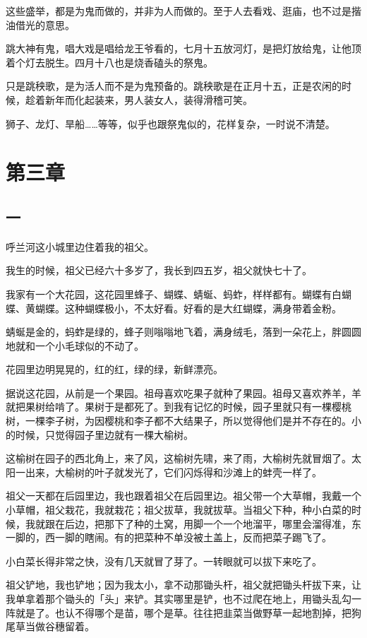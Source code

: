 \documentclass[UTF8]{ctexart}
\begin{document}
这些盛举，都是为鬼而做的，并非为人而做的。至于人去看戏、逛庙，也不过是揩油借光的意思。

跳大神有鬼，唱大戏是唱给龙王爷看的，七月十五放河灯，是把灯放给鬼，让他顶着个灯去脱生。四月十八也是烧香磕头的祭鬼。

只是跳秧歌，是为活人而不是为鬼预备的。跳秧歌是在正月十五，正是农闲的时候，趁着新年而化起装来，男人装女人，装得滑稽可笑。

狮子、龙灯、旱船……等等，似乎也跟祭鬼似的，花样复杂，一时说不清楚。

\section{第三章}

\subsection{一}

呼兰河这小城里边住着我的祖父。

我生的时候，祖父已经六十多岁了，我长到四五岁，祖父就快七十了。

我家有一个大花园，这花园里蜂子、蝴蝶、蜻蜒、蚂蚱，样样都有。蝴蝶有白蝴蝶、黄蝴蝶。这种蝴蝶极小，不太好看。好看的是大红蝴蝶，满身带着金粉。

蜻蜒是金的，蚂蚱是绿的，蜂子则嗡嗡地飞着，满身绒毛，落到一朵花上，胖圆圆地就和一个小毛球似的不动了。

花园里边明晃晃的，红的红，绿的绿，新鲜漂亮。

据说这花园，从前是一个果园。祖母喜欢吃果子就种了果园。祖母又喜欢养羊，羊就把果树给啃了。果树于是都死了。到我有记忆的时候，园子里就只有一棵樱桃树，一棵李子树，为因樱桃和李子都不大结果子，所以觉得他们是并不存在的。小的时候，只觉得园子里边就有一棵大榆树。

这榆树在园子的西北角上，来了风，这榆树先啸，来了雨，大榆树先就冒烟了。太阳一出来，大榆树的叶子就发光了，它们闪烁得和沙滩上的蚌壳一样了。

祖父一天都在后园里边，我也跟着祖父在后园里边。祖父带一个大草帽，我戴一个小草帽，祖父栽花，我就栽花；祖父拔草，我就拔草。当祖父下种，种小白菜的时候，我就跟在后边，把那下了种的土窝，用脚一个一个地溜平，哪里会溜得准，东一脚的，西一脚的瞎闹。有的把菜种不单没被土盖上，反而把菜子踢飞了。

小白菜长得非常之快，没有几天就冒了芽了。一转眼就可以拔下来吃了。

祖父铲地，我也铲地；因为我太小，拿不动那锄头杆，祖父就把锄头杆拔下来，让我单拿着那个锄头的「头」来铲。其实哪里是铲，也不过爬在地上，用锄头乱勾一阵就是了。也认不得哪个是苗，哪个是草。往往把韭菜当做野草一起地割掉，把狗尾草当做谷穗留着。
\end{document}
